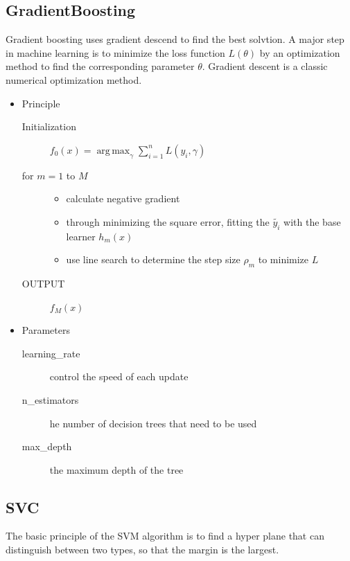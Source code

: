 \subsection{GradientBoosting}

Gradient boosting uses gradient descend 
to find the best solvtion.
A major step in machine learning is 
to minimize the loss function $L(θ)$ 
by an optimization method to 
find the corresponding parameter $θ$. 
Gradient descent is 
a classic numerical optimization method.

\begin{itemize}
	\item Principle
	
	\begin{description}
		\item[Initialization] $ f_{0}(x)=	
		\operatorname{arg\,max}_\gamma 
		\sum\nolimits_{i=1}^n L(y_i,\gamma)$
		
		\item[for $m=1$ to $M$] 
		
		\begin{itemize}
			\item calculate negative gradient
			\item through minimizing the square error, 
			fitting the $ \tilde{y_i} $ 
			with the base learner $h_m(x)$
			\item use line search to 
			determine the step size $\rho_m$ to minimize $L$
		\end{itemize}
		
		\item[OUTPUT] $f_M(x)$
	\end{description}
	
	\item Parameters
	
	\begin{description}
		\item[learning_rate] control the speed of each update
		\item[n_estimators] he number of decision trees that 
		need to be used
		\item[max_depth] the maximum depth of the tree
	\end{description}
\end{itemize}
\subsection{SVC}


The basic principle of the SVM algorithm is 
to find a hyper plane that can 
distinguish between two types, 
so that the margin is the largest.

